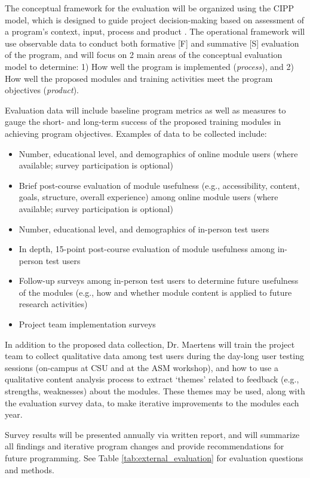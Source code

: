 \documentclass[pdftex,english,11pt,parskip=half]{scrartcl}
\begin{document}
The conceptual framework for the evaluation will be organized using the CIPP model, which is designed to guide project decision-making based on assessment of a program’s context, input, process and product \cite{stufflebeam2004cipp}. The operational framework will use observable data to conduct both formative [F] and summative [S] evaluation of the program, and will focus on 2 main areas of the conceptual evaluation model to determine: 1) How well the program is implemented (\textit{process}), and 2) How well the proposed modules and training activities meet the program objectives (\textit{product}).

Evaluation data will include baseline program metrics as well as measures to gauge the short- and long-term success of the proposed training modules in achieving program objectives. Examples of data to be collected include:

\begin{itemize}
\item Number, educational level, and demographics of online module users (where available; survey participation is optional)
\item Brief post-course evaluation of module usefulness (e.g., accessibility, content, goals, structure, overall experience) among online module users (where available; survey participation is optional)
\item Number, educational level, and demographics of in-person test users
\item In depth, 15-point post-course evaluation of module usefulness among in-person test users
\item Follow-up surveys among in-person test users to determine future usefulness of the modules (e.g., how and whether module content is applied to future research activities)
\item Project team implementation surveys
\end{itemize}

In addition to the proposed data collection, Dr. Maertens will train the project team to collect qualitative data among test users during the day-long user testing sessions (on-campus at CSU and at the ASM workshop), and how to use a qualitative content analysis process to extract ‘themes’ related to feedback (e.g., strengths, weaknesses) about the modules. These themes may be used, along with the evaluation survey data, to make iterative improvements to the modules each year.

Survey results will be presented annually via written report, and will summarize all findings and iterative program changes and provide recommendations for future programming. See Table \ref{tab:external_evaluation} for evaluation questions and methods.
\end{document}
